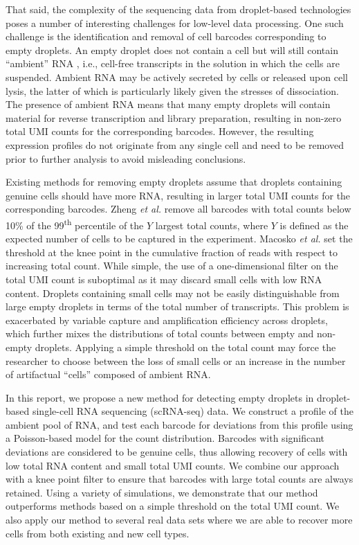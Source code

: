 \documentclass[10pt,letterpaper]{article}
\begin{document}
That said, the complexity of the sequencing data from droplet-based technologies poses a number of interesting challenges for low-level data processing.
One such challenge is the identification and removal of cell barcodes corresponding to empty droplets.
An empty droplet does not contain a cell but will still contain ``ambient'' RNA \cite{macosko2015highly}, i.e., cell-free transcripts in the solution in which the cells are suspended.
Ambient RNA may be actively secreted by cells or released upon cell lysis, the latter of which is particularly likely given the stresses of dissociation.
The presence of ambient RNA means that many empty droplets will contain material for reverse transcription and library preparation, resulting in non-zero total UMI counts for the corresponding barcodes.
However, the resulting expression profiles do not originate from any single cell and need to be removed prior to further analysis to avoid misleading conclusions.

Existing methods for removing empty droplets assume that droplets containing genuine cells should have more RNA, resulting in larger total UMI counts for the corresponding barcodes.
Zheng \textit{et al.} \cite{zheng2017massively} remove all barcodes with total counts below 10\% of the 99\textsuperscript{th} percentile of the $Y$ largest total counts, where $Y$ is defined as the expected number of cells to be captured in the experiment.
Macosko \textit{et al.} \cite{macosko2015highly} set the threshold at the knee point in the cumulative fraction of reads with respect to increasing total count.
While simple, the use of a one-dimensional filter on the total UMI count is suboptimal as it may discard small cells with low RNA content.
Droplets containing small cells may not be easily distinguishable from large empty droplets in terms of the total number of transcripts.
This problem is exacerbated by variable capture and amplification efficiency across droplets, which further mixes the distributions of total counts between empty and non-empty droplets.
Applying a simple threshold on the total count may force the researcher to choose between the loss of small cells or an increase in the number of artifactual ``cells'' composed of ambient RNA.

In this report, we propose a new method for detecting empty droplets in droplet-based single-cell RNA sequencing (scRNA-seq) data.
We construct a profile of the ambient pool of RNA, and test each barcode for deviations from this profile using a Poisson-based model for the count distribution.
Barcodes with significant deviations are considered to be genuine cells, thus allowing recovery of cells with low total RNA content and small total UMI counts.
We combine our approach with a knee point filter to ensure that barcodes with large total counts are always retained.
Using a variety of simulations, we demonstrate that our method outperforms methods based on a simple threshold on the total UMI count.
We also apply our method to several real data sets where we are able to recover more cells from both existing and new cell types.
\end{document}
